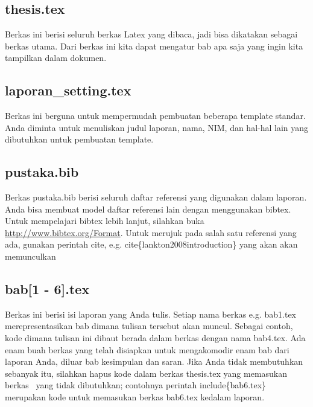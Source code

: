 \chapter{\babEmpat}

\section{thesis.tex}
Berkas ini berisi seluruh berkas Latex yang dibaca, jadi bisa dikatakan sebagai 
berkas utama. Dari berkas ini kita dapat mengatur bab apa saja yang ingin 
kita tampilkan dalam dokumen.


\section{laporan\_setting.tex}
Berkas ini berguna untuk mempermudah pembuatan beberapa template standar. 
Anda diminta untuk menuliskan judul laporan, nama, NIM, dan hal-hal lain yang 
dibutuhkan untuk pembuatan template. 


\section{pustaka.bib}
Berkas pustaka.bib berisi seluruh daftar referensi yang digunakan dalam 
laporan. 
Anda bisa membuat model daftar referensi lain dengan menggunakan bibtex.
Untuk mempelajari bibtex lebih lanjut, silahkan buka 
\url{http://www.bibtex.org/Format}. 
Untuk merujuk pada salah satu referensi yang ada, gunakan perintah \bslash 
cite, e.g. \bslash cite\{lankton2008introduction\} yang akan akan memunculkan 
\cite{lankton2008introduction}


\section{bab[1 - 6].tex}
Berkas ini berisi isi laporan yang Anda tulis. 
Setiap nama berkas e.g. bab1.tex merepresentasikan bab dimana tulisan tersebut 
akan muncul. 
Sebagai contoh, kode dimana tulisan ini dibaut berada dalam berkas dengan nama 
bab4.tex. 
Ada enam buah berkas yang telah disiapkan untuk mengakomodir enam bab dari 
laporan Anda, diluar bab kesimpulan dan saran. 
Jika Anda tidak membutuhkan sebanyak itu, silahkan hapus kode dalam berkas 
thesis.tex yang memasukan berkas \latex~yang tidak dibutuhkan;  contohnya 
perintah \bslash include\{bab6.tex\} merupakan kode untuk memasukan berkas 
bab6.tex kedalam laporan.

